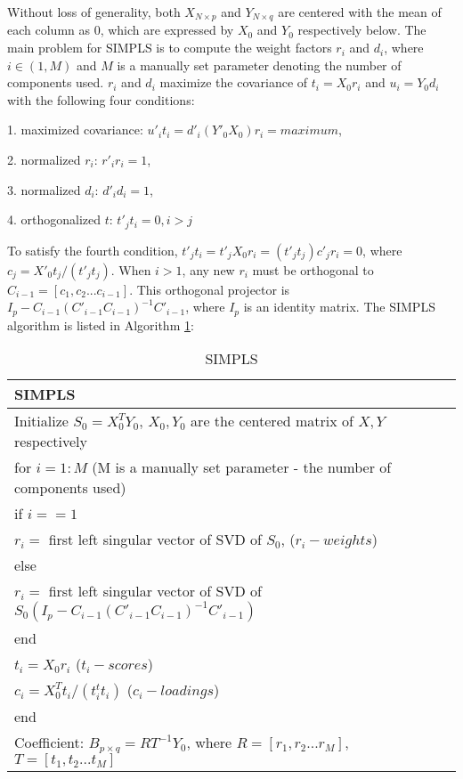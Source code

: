 \documentclass[review]{elsarticle}
\begin{document}
Without loss of generality, both $X_{N\times p}$ and $Y_{N\times q}$ are centered with the mean of each column as $0$, which are expressed by $X_0$ and $Y_0$ respectively below. The main problem for SIMPLS is to compute the weight factors $r_i$ and $d_i$, where $i\in (1,M)$ and $M$ is a manually set parameter denoting the number of components used. $r_i$ and $d_i$ maximize the covariance of $t_i=X_0r_i$ and $u_i=Y_0d_i$ with the following four conditions:

\vspace{2mm}
1. maximized covariance: $u'_it_i=d'_i(Y'_0X_0)r_i = maximum$, 

2. normalized $r_i$: $r'_ir_i=1$, 

3. normalized $d_i$: $d'_id_i=1$, 

4. orthogonalized $t$: $t'_jt_i=0, i>j$
\vspace{2mm}

To satisfy the fourth condition, $t'_jt_i=t'_jX_0r_i=(t'_jt_j)c'_jr_i=0$, where $c_j=X'_0t_j/(t'_jt_j)$. When $i>1$, any new $r_i$ must be orthogonal to $C_{i-1}=[c_1,c_2...c_{i-1}]$. This orthogonal projector is $I_p-C_{i-1}(C'_{i-1}C_{i-1})^{-1}C'_{i-1}$, where $I_p$ is an identity matrix. The SIMPLS algorithm is listed in Algorithm \ref{tab:SIMPLS}:

\begin{table}
\centering
\caption{SIMPLS}
\begin{tabular}{l}
\hline 
\textbf{SIMPLS} \vspace{0.5mm} \\
\hline
Initialize $S_0=X_0^TY_0$, $X_0,Y_0$ are the centered matrix of $X, Y$ respectively\vspace{0.5mm}\\
for $i=1:M$ (M is a manually set parameter - the number of components used) \\
\hspace{0.5cm} if $i==1$ \\
\hspace{1cm}$r_i=$ first left singular vector of SVD of $S_0$, ($r_i - weights$)\\
\hspace{0.5cm} else \\
\hspace{1cm}$r_i=$ first left singular vector of SVD of $S_0(I_p -C_{i-1}(C'_{i-1}C_{i-1})^{-1}C'_{i-1})$\\ 
\hspace{0.5cm} end \vspace{0.5mm} \\
\hspace{0.5cm}$t_i=X_0r_i$ ($t_i - scores$)\\
\hspace{0.5cm}$c_i=X_0^Tt_i/(t_i^tt_i)$ ($c_i - loadings$)\\
end\vspace{0.5mm}\\
Coefficient: $B_{p\times q}=RT^{-1}Y_0$, where $R=[r_1,r_2...r_M],$ $T=[t_1,t_2...t_M]$ \vspace{0.5mm}\\
\hline
\end{tabular}
\label{tab:SIMPLS} 
\end{table}
\end{document}
